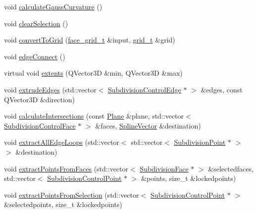 \begin{DoxyCompactItemize}
\item 
void \hyperlink{classShipCAD_1_1SubdivisionSurface_a3aa7c4fd1fa84170a59e6c0549573c92}{calculate\-Gauss\-Curvature} ()
\item 
void \hyperlink{classShipCAD_1_1SubdivisionSurface_a2a984cc9ae8c78153113552cfb6321d5}{clear\-Selection} ()
\item 
void \hyperlink{classShipCAD_1_1SubdivisionSurface_a1deabf43f6a24c34a58889d0361b0959}{convert\-To\-Grid} (\hyperlink{classShipCAD_1_1SubdivisionSurface_a26a7d7b71acd662b1014ab39af4ee343}{face\-\_\-grid\-\_\-t} \&input, \hyperlink{classShipCAD_1_1SubdivisionSurface_a69d4a3ca038ee247d0abcffa6125df95}{grid\-\_\-t} \&grid)
\item 
void \hyperlink{classShipCAD_1_1SubdivisionSurface_aa0460120d8a093682ca352a47affdb87}{edge\-Connect} ()
\item 
virtual void \hyperlink{classShipCAD_1_1SubdivisionSurface_abc1cf0168290242dfbe5dd0d178fa7cb}{extents} (Q\-Vector3\-D \&min, Q\-Vector3\-D \&max)
\item 
void \hyperlink{classShipCAD_1_1SubdivisionSurface_ac19570e1402deab738d2231d6bec9650}{extrude\-Edges} (std\-::vector$<$ \hyperlink{classShipCAD_1_1SubdivisionControlEdge}{Subdivision\-Control\-Edge} $\ast$ $>$ \&edges, const Q\-Vector3\-D \&direction)
\item 
void \hyperlink{classShipCAD_1_1SubdivisionSurface_a9fa189058cbdc190d8847c976fd4ae06}{calculate\-Intersections} (const \hyperlink{classShipCAD_1_1Plane}{Plane} \&plane, std\-::vector$<$ \hyperlink{classShipCAD_1_1SubdivisionControlFace}{Subdivision\-Control\-Face} $\ast$ $>$ \&faces, \hyperlink{namespaceShipCAD_a053b941b2c87049bb9380428d4d5a056}{Spline\-Vector} \&destination)
\item 
void \hyperlink{classShipCAD_1_1SubdivisionSurface_a17dccf4965b49427d345bd5acce897c5}{extract\-All\-Edge\-Loops} (std\-::vector$<$ std\-::vector$<$ \hyperlink{classShipCAD_1_1SubdivisionPoint}{Subdivision\-Point} $\ast$ $>$ $>$ \&destination)
\item 
void \hyperlink{classShipCAD_1_1SubdivisionSurface_af62ba549d058dfddd4bfa1b69a577220}{extract\-Points\-From\-Faces} (std\-::vector$<$ \hyperlink{classShipCAD_1_1SubdivisionFace}{Subdivision\-Face} $\ast$ $>$ \&selectedfaces, std\-::vector$<$ \hyperlink{classShipCAD_1_1SubdivisionControlPoint}{Subdivision\-Control\-Point} $\ast$ $>$ \&points, size\-\_\-t \&lockedpoints)
\item 
void \hyperlink{classShipCAD_1_1SubdivisionSurface_af0f0d7bb979c8c8ba04b9be26e7cfe30}{extract\-Points\-From\-Selection} (std\-::vector$<$ \hyperlink{classShipCAD_1_1SubdivisionControlPoint}{Subdivision\-Control\-Point} $\ast$ $>$ \&selectedpoints, size\-\_\-t \&lockedpoints)

\end{DoxyCompactItemize}
